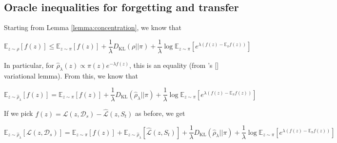 \documentclass[letterpaper]{article}
\theoremstyle{definition}
\begin{document}


\subsection{Oracle inequalities for forgetting and transfer}

Starting from Lemma \ref{lemma:concentration}, we know that 

$$\mathbb{E}_{z\sim \rho}\left [f(z) \right ]\leq \mathbb{E}_{z\sim \pi}\left [f(z) \right ]+ \frac{1}{\lambda}D_{\mathrm{KL}}(\rho||\pi)+ \frac{1}{\lambda}\log\mathbb{E}_{z\sim \pi}\left [e^{\lambda(f(z)-\mathbb{E}_\pi f(z))} \right ]$$

In particular, for $\hat{\rho}_\lambda(z)\propto \pi(z) e^{-\lambda f(z) }$, this is an equality (from \citeauthor{donsker1975large}'s [\citeyear{donsker1975large}] variational lemma).
From this, we know that

\begin{equation}
\mathbb{E}_{z\sim \hat{\rho}_\lambda}\left [f(z) \right ]= \mathbb{E}_{z\sim \pi}\left [f(z) \right ]+ \frac{1}{\lambda}D_{\mathrm{KL}}(\hat{\rho}_\lambda||\pi)+ \frac{1}{\lambda}\log\mathbb{E}_{z\sim \pi}\left [e^{\lambda(f(z)-\mathbb{E}_\pi f(z))} \right ]
\end{equation}

If we pick $f(z)=\mathcal{L}(z,\mathcal{D}_s)-\hat{\mathcal{L}}(z,S_t)$ as before, we get

$$\mathbb{E}_{z\sim \hat{\rho}_\lambda}\left [\mathcal{L}(z,\mathcal{D}_s) \right ]= \mathbb{E}_{z\sim \pi}\left [f(z) \right ]+\mathbb{E}_{z\sim \hat{\rho}_\lambda}\left [\hat{\mathcal{L}}(z,S_t) \right ]+ \frac{1}{\lambda}D_{\mathrm{KL}}(\hat{\rho}_\lambda||\pi)+ \frac{1}{\lambda}\log\mathbb{E}_{z\sim \pi}\left [e^{\lambda(f(z)-\mathbb{E}_\pi f(z))} \right ]$$
\end{document}

